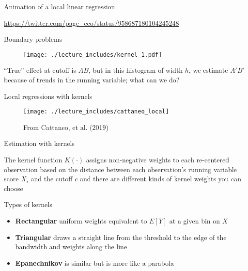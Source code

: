 \documentclass{beamer}
\begin{document}
\begin{frame}{Animation of a local linear regression}

\url{https://twitter.com/page_eco/status/958687180104245248}

\end{frame}


\begin{frame}{Boundary problems}
	
		\begin{figure}
		\texttt{[image: ./lecture\_includes/kernel\_1.pdf]}
		\end{figure}

``True'' effect at cutoff is $AB$, but in this histogram of width $h$, we estimate $A'B'$ because of trends in the running variable; what can we do?

	
\end{frame}


\begin{frame}{Local regressions with kernels}

		\begin{figure}
		\texttt{[image: ./lecture\_includes/cattaneo\_local]}
		\caption{From Cattaneo, et al. (2019)}
		\end{figure}

\end{frame}

\begin{frame}{Estimation with kernels}

The kernel function $K(\cdot)$ assigns non-negative weights to each re-centered observation based on the distance between each observation's running variable score $X_i$ and the cutoff $c$ and there are different kinds of kernel weights you can choose

\end{frame}

\begin{frame}{Types of kernels}

\begin{itemize}
	\item \textbf{Rectangular} uniform weights equivalent to $E[Y]$ at a given bin on $X$
	\item \textbf{Triangular} draws a straight line from the threshold to the edge of the bandwidth and weights along the line
	\item \textbf{Epanechnikov} is similar but is more like a parabola
\end{itemize}
\end{frame}
\end{document}
